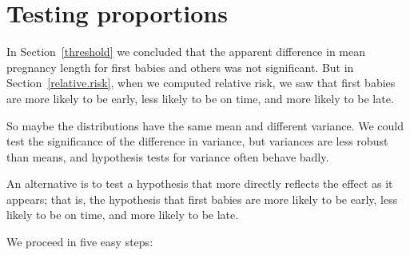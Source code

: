 \documentclass[12pt]{book}
\begin{document}
\section{Testing proportions}

In Section~\ref{threshold} we concluded that the apparent difference
in mean pregnancy length for first babies and others was not
significant.  But in Section~\ref{relative.risk}, when we computed
relative risk, we saw that first babies are more likely to be early,
less likely to be on time, and more likely to be late.

So maybe the distributions have the same mean and different variance.
We could test the significance of the difference in variance, but
variances are less robust than means, and hypothesis tests for
variance often behave badly.

An alternative is to test a hypothesis that more directly reflects the
effect as it appears; that is, the hypothesis that first babies are
more likely to be early, less likely to be on time, and more likely to
be late.

We proceed in five easy steps:
\end{document}
